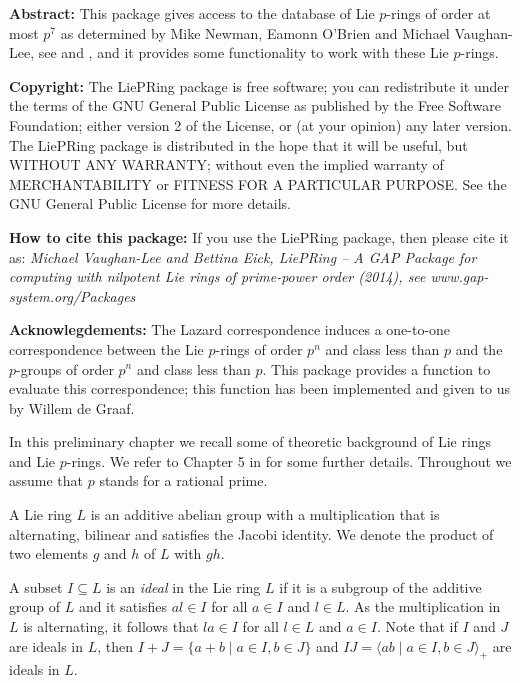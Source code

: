 

{\bf Abstract:}
This package gives access to the database of Lie $p$-rings of order at most 
$p^7$ as determined by Mike Newman, Eamonn O'Brien and Michael Vaughan-Lee, 
see \cite{NOV04} and \cite{OVL05}, and it provides some functionality to 
work with these Lie $p$-rings.
\bigskip

{\bf Copyright:}
The LiePRing package is free software; you can redistribute it under the 
terms of the GNU General Public License as published by the Free Software 
Foundation; either version 2 of the License, or (at your opinion) any 
later version. The LiePRing package is distributed in the hope that it will 
be useful, but WITHOUT ANY WARRANTY; without even the implied warranty of
MERCHANTABILITY or FITNESS FOR A PARTICULAR PURPOSE. See the GNU General 
Public License for more details.
\bigskip

{\bf How to cite this package:}
If you use the LiePRing package, then please cite it as:
{\it Michael Vaughan-Lee and Bettina Eick, LiePRing -- A GAP Package for
computing with nilpotent Lie rings of prime-power order (2014), see
www.gap-system.org/Packages}
\bigskip

{\bf Acknowlegdements:}
The Lazard correspondence induces a one-to-one correspondence between the
Lie $p$-rings of order $p^n$ and class less than $p$ and the $p$-groups of 
order $p^n$ and class less than $p$. This package provides a function to 
evaluate this correspondence; this function has been implemented and given
to us by Willem de Graaf. 


In this preliminary chapter we recall some of theoretic background
of Lie rings and Lie $p$-rings. We refer to Chapter 5 in \cite{Khu} 
for some further details. Throughout we assume that $p$ stands for 
a rational prime.
\medskip

A Lie ring $L$ is an additive abelian group with a multiplication that
is alternating, bilinear and satisfies the Jacobi identity. We denote 
the product of two elements $g$ and $h$ of $L$ with $g h$.
\medskip

A subset $I \subseteq L$ is an {\it ideal} in the Lie ring $L$ if it
is a subgroup of the additive group of $L$ and it satisfies $a l \in 
I$ for all $a \in I$ and $l \in L$. As the multiplication in $L$ is
alternating, it follows that $l a \in I$ for all $l \in L$ and $a \in 
I$. Note that if $I$ and $J$ are ideals in $L$, then $I + J = \{
a + b \mid a \in I, b \in J\}$ and $I J = \langle a b \mid 
a \in I, b \in J \rangle_+$ are ideals in $L$.
\medskip

